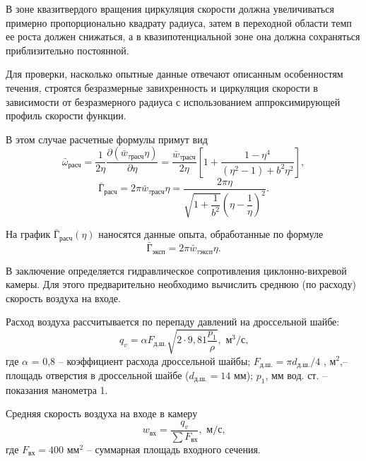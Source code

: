 \documentclass[12pt,a4paper]{article}
\begin{document}
В зоне квазитвердого вращения
циркуляция скорости должна увеличиваться примерно пропорционально квадрату радиуса, затем в переходной области темп ее роста
должен снижаться, а в квазипотенциальной зоне она должна сохраняться приблизительно постоянной.

Для проверки, насколько опытные данные отвечают описанным особенностям течения, строятся безразмерные завихренность
и циркуляция скорости в зависимости от безразмерного радиуса с использованием аппроксимирующей профиль скорости функции.

В этом случае расчетные формулы примут вид
\begin{equation}
\bar \omega_{\text{расч}} = \dfrac{1}{2\eta}\dfrac{\partial \left(\bar w_{\tau\text{расч}} \eta \right)}{\partial \eta} = \dfrac{\bar w_{\tau\text{расч}}}{2\eta}\left[1+\dfrac{1-\eta^4}{\left(\eta^2 -1 \right) + b^2\eta^2} \right],
\end{equation}
\begin{equation}
\bar {\text{Г}}_{\text{расч}} = 2\pi \bar w_{\tau\text{расч}} \eta = \dfrac{2\pi\eta}{\sqrt{1+\dfrac{1}{b^2}}\left(\eta - \dfrac{1}{\eta} \right)^2}.
\end{equation}

На график $\bar {\text{Г}}_{\text{расч}}(\eta)$
наносятся данные опыта, обработанные по
формуле
\begin{equation}
\bar {\text{Г}}_{\text{эксп}} = 2\pi \bar w_{\tau\text{эксп}} \eta .
\end{equation}

В заключение определяется гидравлическое сопротивления циклонно-вихревой камеры. Для этого предварительно необходимо вычислить среднюю (по расходу) скорость воздуха на входе.

Расход воздуха рассчитывается по перепаду давлений на дроссельной
шайбе:
\begin{equation}
q_v = \alpha F_{\text{д.ш.}}\sqrt{2 \cdot 9,81 \dfrac{p_1}{\rho}}, \text{ м$^3$/с,}
\end{equation}
где $\alpha$ = 0,8 – коэффициент расхода дроссельной шайбы;
$F_{\text{д.ш.}} = \pi d_{\text{д.ш.}}/4$ , м$^2$,– площадь отверстия в дроссельной шайбе
($d_{\text{д.ш.}} = 14$ мм); $p_1$, мм вод. ст. – показания манометра 1.

Средняя скорость воздуха на входе в камеру
\begin{equation}
w_{\text{вх}} = \dfrac{q_v}{\sum F_{\text{вх}}}, \text{ м/с,}
\end{equation}
где $F_{\text{вх}} = 400$ мм$^2$ – суммарная площадь входного сечения.
\end{document}
